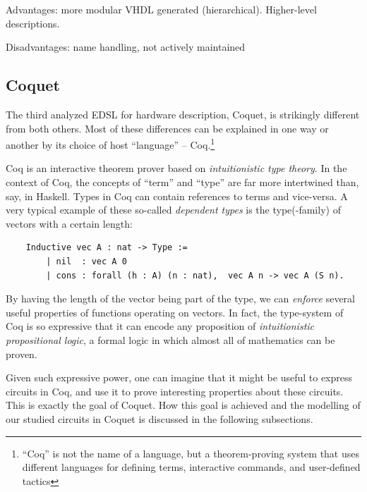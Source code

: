 \documentclass[a4paper]{article}
\begin{document}
                Advantages: more modular VHDL generated (hierarchical). Higher-level descriptions.

                Disadvantages: name handling, not actively maintained


        \subsection{Coquet}
        \label{subsec:coquet}
            The third analyzed EDSL for hardware description, Coquet\cite{coquet2011},
            is strikingly different from both others. Most of these differences can be explained in
            one way or another by its choice of host ``language'' -- Coq.\footnote{``Coq'' is not
                the name of a language, but a theorem-proving system that uses different languages
                for defining terms, interactive commands, and user-defined tactics}

            Coq is an interactive theorem prover based on \emph{intuitionistic type theory}. In the
            context of Coq, the concepts of ``term'' and ``type'' are far more intertwined than,
            say, in Haskell. Types in Coq can contain references to terms and vice-versa. A very
            typical example of these so-called \emph{dependent types} is the type(-family) of
            vectors with a certain length:
            \begin{verbatim}
    Inductive vec A : nat -> Type :=
        | nil  : vec A 0
        | cons : forall (h : A) (n : nat),  vec A n -> vec A (S n).
            \end{verbatim}

            By having the length of the vector being part of the type, we can \emph{enforce} several
            useful properties of functions operating on vectors. In fact, the type-system of Coq is
            so expressive that it can encode any proposition of \emph{intuitionistic propositional
                logic}, a formal logic in which almost all of mathematics can be proven.

            Given such expressive power, one can imagine that it might be useful to express circuits
            in Coq, and use it to prove interesting properties about these circuits. This is exactly
            the goal of Coquet. How this goal is achieved and the modelling of our studied circuits
            in Coquet is discussed in the following subsections.
\end{document}
